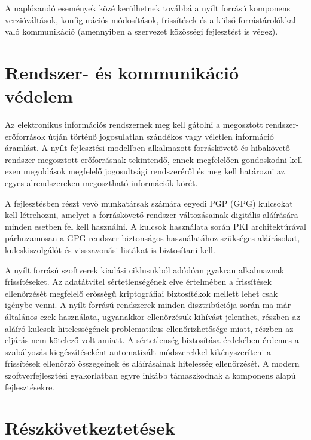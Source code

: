 \documentclass[12pt,magyar,a4paper,oneside]{scrreprt}
\begin{document}
A naplózandó események közé kerülhetnek továbbá a nyílt forrású
komponens verzióváltások, konfigurációs módosítások, frissítések és a
külső forrástárolókkal való kommunikáció (amennyiben a szervezet
közösségi fejlesztést is végez).

\hypertarget{rendszer--uxe9s-kommunikuxe1ciuxf3-vuxe9delem}{%
\section{Rendszer- és kommunikáció
védelem}\label{rendszer--uxe9s-kommunikuxe1ciuxf3-vuxe9delem}}

Az elektronikus információs rendszernek meg kell gátolni a megosztott
rendszer-erőforrások útján történő jogosulatlan szándékos vagy véletlen
információ áramlást. A nyílt fejlesztési modellben alkalmazott
forráskövető és hibakövető rendszer megosztott erőforrásnak tekintendő,
ennek megfelelően gondoskodni kell ezen megoldások megfelelő
jogosultsági rendszeréről és meg kell határozni az egyes alrendszereken
megosztható információk körét.

A fejlesztésben részt vevő munkatársak számára egyedi PGP (GPG)
kulcsokat kell létrehozni, amelyet a forráskövető-rendszer változásainak
digitális aláírására minden esetben fel kell használni. A kulcsok
használata során PKI architektúrával párhuzamosan a GPG rendszer
biztonságos használatához szükséges aláírásokat, kulcskiszolgálót és
visszavonási listákat is biztosítani kell.

A nyílt forrású szoftverek kiadási ciklusukból adódóan gyakran
alkalmaznak frissítéseket. Az adatátvitel sértetlenségének elve
értelmében a frissítések ellenőrzését megfelelő erősségű kriptográfiai
biztosítékok mellett lehet csak igénybe venni. A nyílt forrású
rendszerek minden disztribúciója során ma már általános ezek használata,
ugyanakkor ellenőrzésük kihívást jelenthet, részben az aláíró kulcsok
hitelességének problematikus ellenőrizhetősége miatt, részben az eljárás
nem kötelező volt amiatt. A sértetlenség biztosítása érdekében érdemes a
szabályozás kiegészítéseként automatizált módszerekkel kikényszeríteni a
frissítések ellenőrző összegeinek és aláírásainak hitelesség
ellenőrzését. A modern szoftverfejlesztési gyakorlatban egyre inkább
támaszkodnak a komponens alapú fejlesztésekre.

\hypertarget{ruxe9szkuxf6vetkeztetuxe9sek-4}{%
\section{Részkövetkeztetések}\label{ruxe9szkuxf6vetkeztetuxe9sek-4}}
\end{document}
